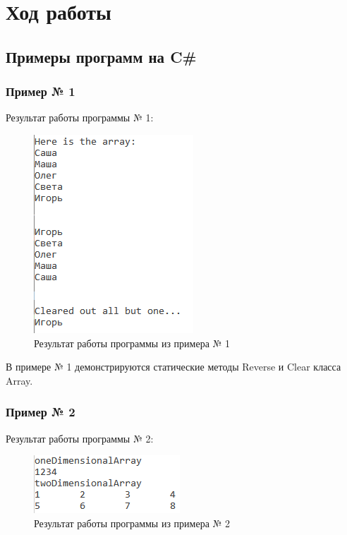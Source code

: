 \documentclass[a4paper,14pt]{extarticle}
\begin{document}
    \pagebreak
    
    \section{Ход работы}

    \subsection{Примеры программ на C\#}

    \subsubsection{Пример № 1}

    Результат работы программы № 1:

    \begin{figure}[H]
        \centering
        \includegraphics[width=.4\textwidth]{Example1}
        \caption{Результат работы программы из примера № 1}
    \end{figure}

    В примере № 1 демонстрируются статические методы Reverse и Clear
    класса Array.

    \subsubsection{Пример № 2}

    Результат работы программы № 2:

    \begin{figure}[H]
        \centering
        \includegraphics[width=.4\textwidth]{Example2}
        \caption{Результат работы программы из примера № 2}
    \end{figure}
\end{document}
